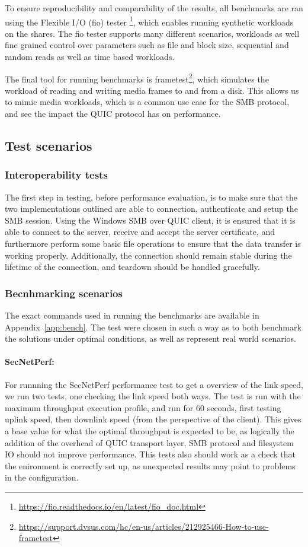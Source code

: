 \documentclass[english, 12pt, a4paper, elec, utf8, a-2b, online]{aaltothesis}
\begin{document}
To ensure reproducibility and comparability of the results, all benchmarks are ran
using the Flexible I/O (fio) tester \footnote{\url{https://fio.readthedocs.io/en/latest/fio_doc.html}},
which enables running synthetic workloads on the shares. The fio tester supports
many different scenarios, workloads as well fine grained control over parameters
such as file and block size, sequential and random reads as well as time based workloads.

The final tool for running benchmarks is frametest\footnote{\url{https://support.dvsus.com/hc/en-us/articles/212925466-How-to-use-frametest}}, which simulates the workload of
reading and writing media frames to and from a disk. This allows us to mimic media
workloads, which is a common use case for the SMB protocol, and see the impact
the QUIC protocol has on performance.

\subsection{Test scenarios}

\subsubsection{Interoperability tests}

The first step in testing, before performance evaluation, is to make sure that
the two implementations outlined are able to connection, authenticate and setup
the SMB session. Using the Windows SMB over QUIC client, it is ensured that it
is able to connect to the server, receive and accept the server certificate, and
furthermore perform some basic file operations to ensure that the data transfer is
working properly. Additionally, the connection should remain stable during the lifetime
of the connection, and teardown should be handled gracefully.

\subsubsection{Becnhmarking scenarios}

The exact commands used in running the benchmarks are available in Appendix~\ref{app:bench}.
The test were chosen in such a way as to both benchmark the solutions under optimal conditions,
as well as represent real world scenarios.

\paragraph{SecNetPerf:}
For runnning the SecNetPerf performance test to get a overview of the link speed,
we run two tests, one checking the link speed both ways. The test is run with the maximum
throughput execution profile, and run for 60 seconds, first testing uplink speed,
then downlink speed (from the perspective of the client). This gives a base value for
what the optimal throughput is expected to be, as logically the addition of the
overhead of QUIC transport layer, SMB protocol and filesystem IO should not improve
performance. This tests also should work as a check that the enironment is correctly
set up, as unexpected results may point to problems in the configuration.
\end{document}
